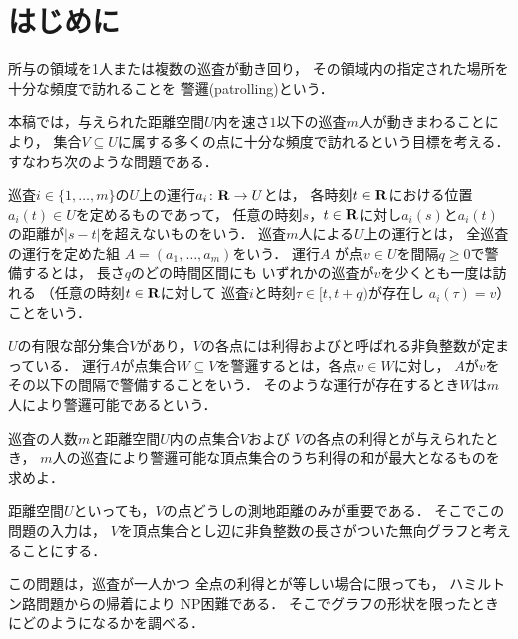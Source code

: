 
\section{はじめに}
所与の領域を1人または複数の巡査が動き回り，
その領域内の指定された場所を十分な頻度で訪れることを
警邏(patrolling)という\cite{chen2013fence, coene2011charlemagne, czyzowicz2011boundary}．


本稿では，与えられた距離空間$U$内を速さ$1$以下の巡査$m$人が動きまわることにより，
集合$V \subseteq U$に属する多くの点に十分な頻度で訪れるという目標を考える．
すなわち次のような問題である．

巡査$i \in \{1, \ldots, m\}$の$U$上の運行$a _i \colon \mathbf R \to U$とは，
各時刻$t \in \mathbf R$における位置$a _i (t) \in U$を定めるものであって，
任意の時刻$s$，$t \in \mathbf R$に対し$a _i (s)$と$a _i (t)$の距離が$\lvert s - t \rvert$を超えないものをいう．
巡査$m$人による$U$上の運行とは，
全巡査の運行を定めた組
$A = (a _1, \dots, a _m)$をいう．
運行$A$%
が点$v \in U$を間隔$q \geq 0$で警備するとは，
長さ$q$のどの時間区間にも
いずれかの巡査が$v$を少くとも一度は訪れる
（任意の時刻$t \in \mathbf R$に対して
巡査$i$と時刻$\tau \in [t, t + q)$が存在し
$a _i (\tau) = v$）ことをいう．

$U$の有限な部分集合$V$があり，$V$の各点には利得および{\idletime}と呼ばれる非負整数が定まっている．
運行$A$が点集合$W \subseteq V$を警邏するとは，各点$v \in W$に対し，
$A$が$v$をその{\idletime}以下の間隔で警備することをいう．
そのような運行が存在するとき$W$は$m$人により警邏可能であるという．

\begin{cooperativepatrollingproblem}
  巡査の人数$m$と距離空間$U$内の点集合$V$および
  $V$の各点の利得と{\idletime}が与えられたとき，
  $m$人の巡査により警邏可能な頂点集合のうち利得の和が最大となるものを求めよ．
\end{cooperativepatrollingproblem}

距離空間$U$といっても，$V$の点どうしの測地距離のみが重要である．
そこでこの問題の入力は，
$V$を頂点集合とし辺に非負整数の長さがついた無向グラフと考えることにする．

この問題は，巡査が一人かつ
全点の利得と{\idletime}が等しい場合に限っても，
ハミルトン路問題からの帰着により
NP困難である\cite[Theorem~8]{coene2011charlemagne}．
そこでグラフの形状を限ったときにどのようになるかを調べる．

